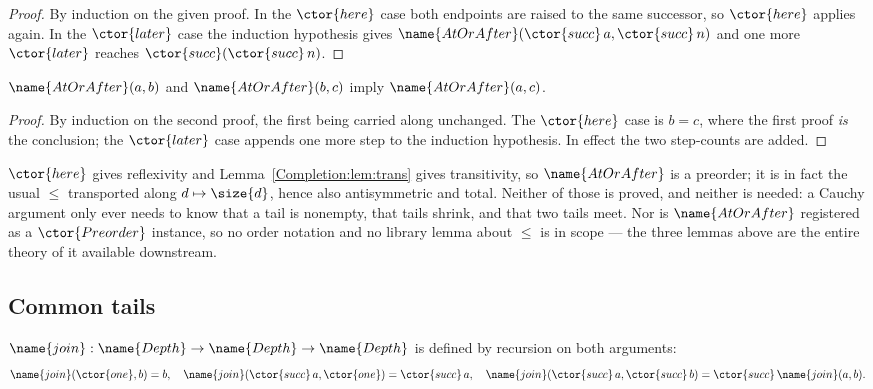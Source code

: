 \begin{proof}
By induction on the given proof.  In the $\ctor{here}$ case both endpoints are
raised to the same successor, so $\ctor{here}$ applies again.  In the
$\ctor{later}$ case the induction hypothesis gives
$\name{AtOrAfter}(\ctor{succ}\,a, \ctor{succ}\,n)$ and one more $\ctor{later}$
reaches $\ctor{succ}(\ctor{succ}\,n)$.
\end{proof}

\begin{lemma}\label{Completion:lem:trans}
$\name{AtOrAfter}(a,b)$ and $\name{AtOrAfter}(b,c)$ imply
$\name{AtOrAfter}(a,c)$.
\end{lemma}

\begin{proof}
By induction on the second proof, the first being carried along unchanged.  The
$\ctor{here}$ case is $b = c$, where the first proof \emph{is} the conclusion;
the $\ctor{later}$ case appends one more step to the induction hypothesis.  In
effect the two step-counts are added.
\end{proof}

\begin{remark}
\label{Completion:rem:preorder}
$\ctor{here}$ gives reflexivity and Lemma~\ref{Completion:lem:trans} gives
transitivity, so $\name{AtOrAfter}$ is a preorder; it is in fact the usual
$\leq$ transported along $d \mapsto \size{d}$, hence also antisymmetric and
total.  Neither of those is proved, and neither is needed: a Cauchy argument
only ever needs to know that a tail is nonempty, that tails shrink, and that
two tails meet.  Nor is $\name{AtOrAfter}$ registered as a $\ctor{Preorder}$
instance, so no order notation and no library lemma about $\leq$ is in scope
--- the three lemmas above are the entire theory of it available downstream.
\end{remark}

\subsection{Common tails}

\begin{definition}\label{Completion:def:join}
$\name{join} : \name{Depth} \to \name{Depth} \to \name{Depth}$ is defined by
recursion on both arguments:
\[
  \name{join}(\ctor{one}, b) = b,
  \quad
  \name{join}(\ctor{succ}\,a, \ctor{one}) = \ctor{succ}\,a,
  \quad
  \name{join}(\ctor{succ}\,a, \ctor{succ}\,b) =
    \ctor{succ}\,\name{join}(a,b).
\]
\end{definition}

